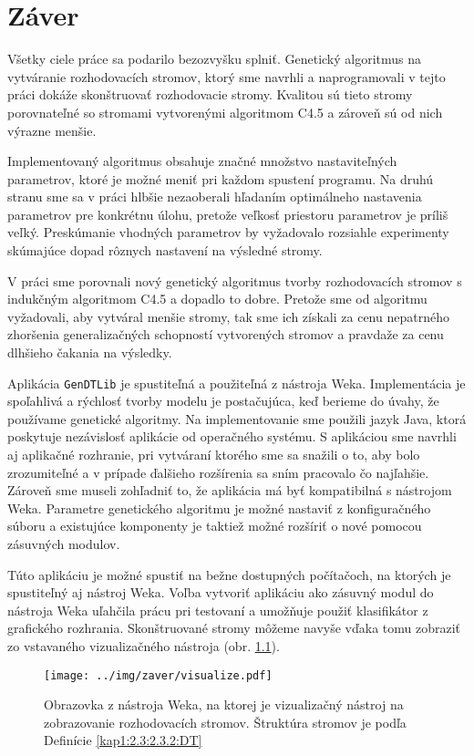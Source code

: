 \chapter{Záver}\label{kap:fin}
\renewcommand{\figurename}{Obrázok}
Všetky ciele práce sa podarilo bezozvyšku splniť. Genetický algoritmus na vytváranie rozhodovacích stromov, ktorý sme navrhli a naprogramovali v tejto práci dokáže skonštruovať rozhodovacie stromy. Kvalitou sú tieto stromy porovnateľné so stromami vytvorenými algoritmom C4.5 a zároveň sú od nich výrazne menšie.

Implementovaný algoritmus obsahuje značné množstvo nastaviteľných parametrov, ktoré je možné meniť pri každom spustení programu. Na druhú stranu sme sa v práci hlbšie nezaoberali hľadaním optimálneho nastavenia parametrov pre konkrétnu úlohu, pretože veľkosť priestoru parametrov je príliš veľký. Preskúmanie vhodných parametrov by vyžadovalo rozsiahle experimenty skúmajúce dopad rôznych nastavení na výsledné stromy.

V práci sme porovnali nový genetický algoritmus tvorby rozhodovacích stromov s indukčným algoritmom C4.5 a dopadlo to dobre.
Pretože sme od algoritmu vyžadovali, aby vytváral menšie stromy, tak sme ich získali za cenu nepatrného zhoršenia generalizačných schopností vytvorených stromov a pravdaže za cenu dlhšieho čakania na výsledky.

Aplikácia \verb|GenDTLib| je spustiteľná a použiteľná z nástroja Weka. Implementácia je spoľahlivá a rýchlosť tvorby modelu je postačujúca, keď berieme do úvahy, že používame genetické algoritmy. Na implementovanie sme použili jazyk Java, ktorá poskytuje nezávislosť aplikácie od operačného systému. S aplikáciou sme navrhli aj aplikačné rozhranie, pri vytváraní ktorého sme sa snažili o to, aby bolo zrozumiteľné a v prípade ďalšieho rozšírenia sa sním pracovalo čo najľahšie. Zároveň sme museli zohľadniť to, že aplikácia má byť kompatibilná s nástrojom Weka. Parametre genetického algoritmu je možné nastaviť z konfiguračného súboru a existujúce komponenty je taktiež možné rozšíriť o nové pomocou zásuvných modulov.

Túto aplikáciu je možné spustiť na bežne dostupných počítačoch, na ktorých je spustiteľný aj nástroj Weka. 
Voľba vytvoriť aplikáciu ako zásuvný modul do nástroja Weka uľahčila prácu pri testovaní a umožňuje použiť klasifikátor z grafického rozhrania. Skonštruované stromy môžeme navyše vďaka tomu zobraziť zo vstavaného vizualizačného nástroja (obr. \ref{fig:wekatree}).

\begin{figure}[h]
\centering
\centerline{\mbox{\texttt{[image: ../img/zaver/visualize.pdf]}}}
\caption{Obrazovka z nástroja Weka, na ktorej je vizualizačný nástroj na zobrazovanie rozhodovacích stromov. Štruktúra stromov je podľa Definície \ref{kap1:2.3:2.3.2:DT}}\label{fig:wekatree}
\end{figure}

